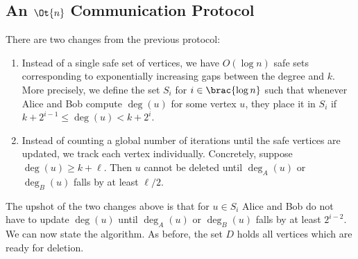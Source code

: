 \subsection{An \texorpdfstring{$\Ot{n}$}{Õ(n)} Communication Protocol}

There are two changes from the previous protocol:
\begin{enumerate}
  \item 
    Instead of a single safe set of vertices, we have $O( \log n )$ safe sets
    corresponding to exponentially increasing gaps between the degree and $k$.
    More precisely, we define the set $S_i$ for $i \in \brac{\log n}$ such that
    whenever Alice and Bob compute $\deg(u)$ for some vertex $u$, they place it
    in $S_i$ if $k + 2^{i - 1} \leq \deg(u) < k + 2^i$.
  \item
    Instead of counting a global number of iterations until the safe vertices
    are updated, we track each vertex individually.
    Concretely, suppose $\deg(u) \geq k + \ell$.
    Then $u$ cannot be deleted until $\deg_A(u)$ or $\deg_B(u)$ falls by
    at least $\ell / 2$.
\end{enumerate}
The upshot of the two changes above is that for $u \in S_i$ Alice and Bob do not
have to update $\deg(u)$ until $\deg_A(u)$ or $\deg_B(u)$ falls by at least
$2^{i - 2}$.
We can now state the algorithm.
As before, the set $D$ holds all vertices which are ready for deletion.

